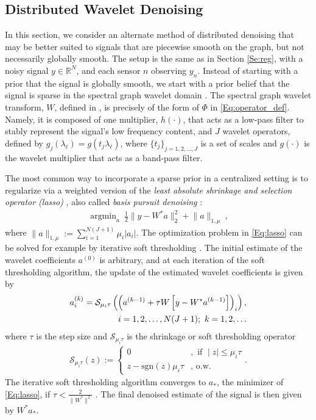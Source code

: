 \documentclass[conference]{IEEEtran}
\DeclareMathOperator*{\argmin}{argmin}
\renewcommand{\l}{\ell}
\newcommand{\norm}[1]{\lVert#1\rVert}
\newcommand{\R}{{\mathbb{R}}}
\newcommand{\Scal}{\mathcal{S}}
\begin{document}
\subsection{Distributed Wavelet Denoising}\label{Se:denoising}
In this section, we consider an alternate method of distributed denoising that may be better suited to signals that are piecewise smooth on the graph, but not necessarily globally smooth. The setup is the same as in Section \ref{Se:reg}, with a noisy signal $y \in \R^N$,
and each sensor $n$ observing $y_n$. Instead of starting with a prior that the signal is globally smooth, we start with a prior belief that the signal is sparse in the spectral graph wavelet domain \cite{LTS-ARTICLE-2009-053}.
The spectral graph wavelet transform, $W$, defined in \cite{LTS-ARTICLE-2009-053}, is precisely of the form of $\Phi$ in \eqref{Eq:operator_def}. Namely, it is composed of one multiplier, $h(\cdot)$, that acts as a low-pass filter to stably represent the signal's low frequency content, and $J$ wavelet operators, defined by $g_j(\lambda_{\l})=g(t_j \lambda_{\l})$, where $\{t_j\}_{j=1,2,\ldots,J}$ is a set of scales and $g(\cdot)$ is the wavelet multiplier that acts as a band-pass filter.

The most common way to incorporate a sparse prior in a centralized setting is to regularize via a weighted version of the \emph{least absolute shrinkage and selection operator (lasso)} \cite{lasso}, also called \emph{basis pursuit denoising} \cite{basispursuit}:
\begin{eqnarray} \label{Eq:lasso}
\argmin_{a}~\frac{1}{2}\norm{y-W^*{a}}_2^2+\norm{{a}}_{1,\mu}~,
\end{eqnarray}
where
$\norm{{a}}_{1,\mu}:=\sum_{i=1}^{N(J+1)} \mu_i \left|{a}_i\right|$.
The optimization problem in \eqref{Eq:lasso} can be solved for example by iterative soft thresholding \cite{DDD}. The initial estimate of the wavelet coefficients ${a}^{(0)}$ is arbitrary, and at each iteration of the soft thresholding algorithm, the update of the estimated wavelet coefficients is given by
\begin{eqnarray}\label{Eq:ista_update}
{a}_i^{(k)}=\Scal_{{\mu}_i {\tau}}\left(\Bigl({a}^{(k-1)}+{\tau}W\left[y-W^*{a}^{(k-1)}\right]\Bigr)_i\right),  \nonumber \\
i=1,2,\ldots,N(J+1);~k=1,2,\ldots
\end{eqnarray}
where ${\tau}$ is the step size and $\Scal_{{\mu}_i{\tau}}$ is the shrinkage or soft thresholding operator
\begin{eqnarray*}
\Scal_{{\mu}_i{\tau}}(z):=\left\{
\begin{array}{ll}
0&,\mbox{ if } \mid z \mid \leq {\mu}_i{\tau} \\
z-\mbox{sgn}(z){\mu}_i{\tau}&, \mbox{ o.w.}
\end{array}
\right. .
\end{eqnarray*}
The iterative soft thresholding algorithm converges to ${{a}}_*$, the minimizer of \eqref{Eq:lasso}, if ${\tau} < \frac{2}{{\norm{W^*}^2}}$ \cite{combettes}. The final denoised estimate of the signal is then given by $W^*{{a}}_*$.
\end{document}
